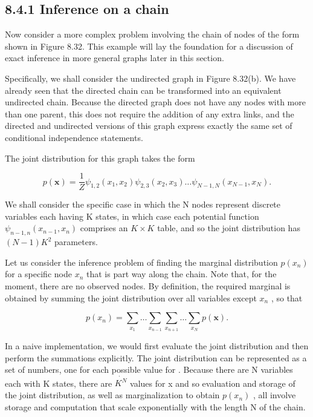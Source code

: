 \documentclass[
  10
]{article}
\begin{document}
\subsection{8.4.1 Inference on a chain}\label{inference-on-a-chain}

Now consider a more complex problem involving the chain of nodes of the
form shown in Figure 8.32. This example will lay the foundation for a
discussion of exact inference in more general graphs later in this
section.

Specifically, we shall consider the undirected graph in Figure 8.32(b).
We have already seen that the directed chain can be transformed into an
equivalent undirected chain. Because the directed graph does not have
any nodes with more than one parent, this does not require the addition
of any extra links, and the directed and undirected versions of this
graph express exactly the same set of conditional independence
statements.

The joint distribution for this graph takes the form

\[
p (\mathbf {x}) = \frac {1}{Z} \psi_ {1, 2} (x _ {1}, x _ {2}) \psi_ {2, 3} (x _ {2}, x _ {3}) \dots \psi_ {N - 1, N} (x _ {N - 1}, x _ {N}).\tag{8.49}
\]

We shall consider the specific case in which the N nodes represent
discrete variables each having K states, in which case each potential
function \(\psi _ { n - 1 , n } ( x _ { n - 1 } , x _ { n } )\)
comprises an \(K \times K\) table, and so the joint distribution has
\(( N - 1 ) K ^ { 2 }\) parameters.

Let us consider the inference problem of finding the marginal
distribution \(p ( x _ { n } )\) for a specific node \(x _ { n }\) that
is part way along the chain. Note that, for the moment, there are no
observed nodes. By definition, the required marginal is obtained by
summing the joint distribution over all variables except \(x _ { n }\) ,
so that

\[
p (x _ {n}) = \sum_ {x _ {1}} \dots \sum_ {x _ {n - 1}} \sum_ {x _ {n + 1}} \dots \sum_ {x _ {N}} p (\mathbf {x}).\tag{8.50}
\]

In a naive implementation, we would first evaluate the joint
distribution and then perform the summations explicitly. The joint
distribution can be represented as a set of numbers, one for each
possible value for . Because there are N variables each with K states,
there are \(\dot { K ^ { N } }\) values for x and so evaluation and
storage of the joint distribution, as well as marginalization to obtain
\(p ( x _ { n } )\) , all involve storage and computation that scale
exponentially with the length N of the chain.
\end{document}
